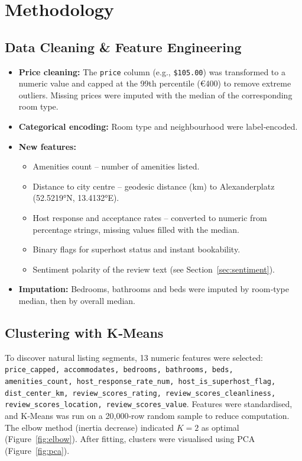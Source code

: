 \documentclass[11pt,a4paper]{article}
\begin{document}
\section{Methodology}
\subsection{Data Cleaning \& Feature Engineering}
\begin{itemize}
    \item \textbf{Price cleaning:} The \texttt{price} column (e.g., \texttt{\$105.00}) was transformed to a numeric value and capped at the 99th percentile (€400) to remove extreme outliers. Missing prices were imputed with the median of the corresponding room type.
    \item \textbf{Categorical encoding:} Room type and neighbourhood were label‑encoded.
    \item \textbf{New features:}
        \begin{itemize}
            \item Amenities count – number of amenities listed.
            \item Distance to city centre – geodesic distance (km) to Alexanderplatz (52.5219°N, 13.4132°E).
            \item Host response and acceptance rates – converted to numeric from percentage strings, missing values filled with the median.
            \item Binary flags for superhost status and instant bookability.
            \item Sentiment polarity of the review text (see Section~\ref{sec:sentiment}).
        \end{itemize}
    \item \textbf{Imputation:} Bedrooms, bathrooms and beds were imputed by room‑type median, then by overall median.
\end{itemize}

\subsection{Clustering with K‑Means}
To discover natural listing segments, 13 numeric features were selected: \texttt{price\_capped, accommodates, bedrooms, bathrooms, beds, amenities\_count, host\_response\_rate\_num, host\_is\_superhost\_flag, dist\_center\_km, review\_scores\_rating, review\_scores\_cleanliness, review\_scores\_location, review\_scores\_value}.  
Features were standardised, and K‑Means was run on a 20,000‑row random sample to reduce computation. The elbow method (inertia decrease) indicated $K=2$ as optimal (Figure~\ref{fig:elbow}).  
After fitting, clusters were visualised using PCA (Figure~\ref{fig:pca}).
\end{document}
